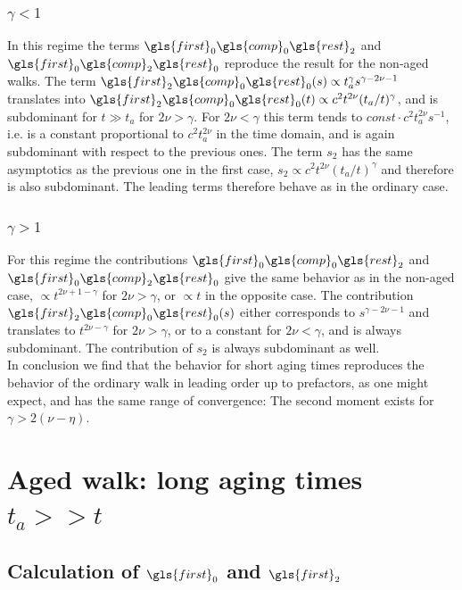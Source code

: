 \subsubsection{$\gamma<1$}
In this regime the terms $\gls{first}_0\gls{comp}_0 \gls{rest}_2 $ and $ \gls{first}_0\gls{comp}_2 \gls{rest}_0$ reproduce the result for the non-aged walks. The term $\gls{first}_2\gls{comp}_0 \gls{rest}_0 (s)  \propto t_a^\gamma s^{\gamma-2\nu -1}$
translates into $\gls{first}_2\gls{comp}_0 \gls{rest}_0 (t) \propto c^2 t^{2\nu}(t_a/t)^\gamma$, and is subdominant for $t \gg t_a$ for $2\nu > \gamma$. For $2\nu < \gamma$ this term tends to $const \cdot  c^2 t_a^{2\nu}s^{-1}$, i.e. is a constant proportional to $c^2 t_a^{2\nu}$ in the time domain, and is again subdominant with respect to the previous ones.
The term $s_2$ has the same asymptotics as the previous one in the first case, $s_2 \propto c^2 t^{2\nu}(t_a/t)^\gamma$ and therefore is also subdominant. The leading terms  therefore behave as in the ordinary case.

\subsubsection{$\gamma>1$}
For this regime the contributions $\gls{first}_0\gls{comp}_0 \gls{rest}_2 $ and $\gls{first}_0\gls{comp}_2 \gls{rest}_0 $ give the same behavior as in the non-aged case, $\propto t^{2\nu +1- \gamma }$ for $2\nu > \gamma$,
or  $\propto t$ in the opposite case. The contribution $\gls{first}_2\gls{comp}_0 \gls{rest}_0 (s)$ either corresponds to $s^{\gamma-2\nu -1}$ and translates to $t^{2\nu - \gamma}$ for $2\nu > \gamma$, or to a constant for $2\nu < \gamma$, and is always subdominant. The contribution of $s_2$ is always subdominant as well. \\

In conclusion we find that the behavior for short aging times reproduces the behavior of the ordinary walk in leading order up to prefactors, as one might expect, and has the same range of convergence: The second moment exists for $\gamma > 2(\nu-\eta)$.


\section{Aged walk: long aging times $t_a >> t$ \label{sec:considerably}}

\subsection*{Calculation of $\gls{first}_0$ and $\gls{first}_2$}

